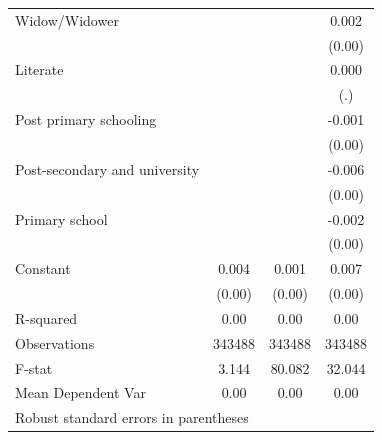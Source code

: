 {\begin{tabular}{l*{3}{c}}
Widow/Widower       &                     &                     &       0.002         \\
                    &                     &                     &      (0.00)         \\
Literate            &                     &                     &       0.000         \\
                    &                     &                     &         (.)         \\
Post primary schooling&                     &                     &      -0.001         \\
                    &                     &                     &      (0.00)         \\
Post-secondary and university&                     &                     &      -0.006\sym{***}\\
                    &                     &                     &      (0.00)         \\
Primary school      &                     &                     &      -0.002\sym{***}\\
                    &                     &                     &      (0.00)         \\
Constant            &       0.004\sym{***}&       0.001         &       0.007\sym{***}\\
                    &      (0.00)         &      (0.00)         &      (0.00)         \\
\hline
R-squared           &        0.00         &        0.00         &        0.00         \\
Observations        &      343488         &      343488         &      343488         \\
F-stat              &       3.144         &      80.082         &      32.044         \\
Mean Dependent Var  &        0.00         &        0.00         &        0.00         \\
\hline\hline
\multicolumn{4}{l}{\footnotesize Robust standard errors in parentheses}\\
\end{tabular}
}
